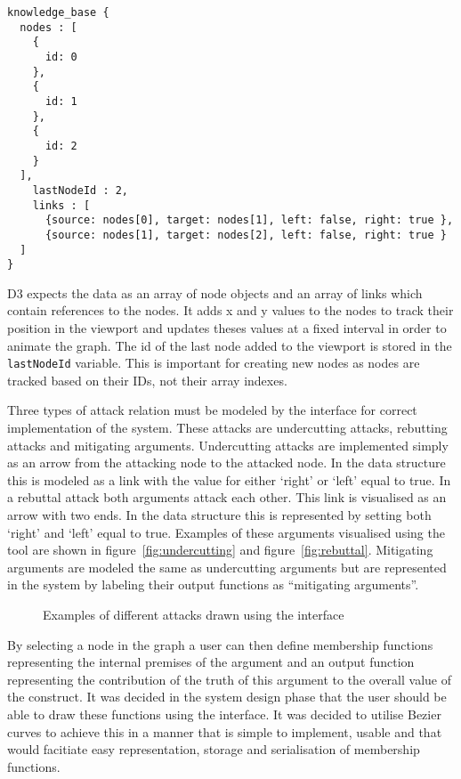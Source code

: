 \begin{lstlisting}[caption={JSON data structure for argumentation framework},label={lst:kbds}]
knowledge_base {
  nodes : [
    {
      id: 0
    },
    {
      id: 1
    },
    {
      id: 2
    }
  ],
    lastNodeId : 2,
    links : [
      {source: nodes[0], target: nodes[1], left: false, right: true },
      {source: nodes[1], target: nodes[2], left: false, right: true }
  ]
}
\end{lstlisting}

D3 expects the data as an array of node objects and an array of links which contain references to the nodes. It adds x and y values to the nodes to track their position in the viewport and updates theses values at a fixed interval in order to animate the graph. The id of the last node added to the viewport is stored in the \lstinline{lastNodeId} variable. This is important for creating new nodes as nodes are tracked based on their IDs, not their array indexes. 

Three types of attack relation must be modeled by the interface for correct implementation of the system. These attacks are undercutting attacks, rebutting attacks and mitigating arguments. Undercutting attacks are implemented simply as an arrow from the attacking node to the attacked node. In the data structure this is modeled as a link with the value for either `right' or `left' equal to true. In a rebuttal attack both arguments attack each other. This link is visualised as an arrow with two ends. In the data structure this is represented by setting both `right' and `left' equal to true. Examples of these arguments visualised using the tool are shown in figure~\ref{fig:undercutting} and figure~\ref{fig:rebuttal}. Mitigating arguments are modeled the same as undercutting arguments but are represented in the system by labeling their output functions as ``mitigating arguments''.

\begin{figure}
\hfill
{}\hfill
\caption{Examples of different attacks drawn using the interface}
\end{figure}

By selecting a node in the graph a user can then define membership functions representing the internal premises of the argument and an output function representing the contribution of the truth of this argument to the overall value of the construct. It was decided in the system design phase that the user should be able to draw these functions using the interface. It was decided to utilise Bezier curves to achieve this in a manner that is simple to implement, usable and that would facitiate easy representation, storage and serialisation of membership functions. 

